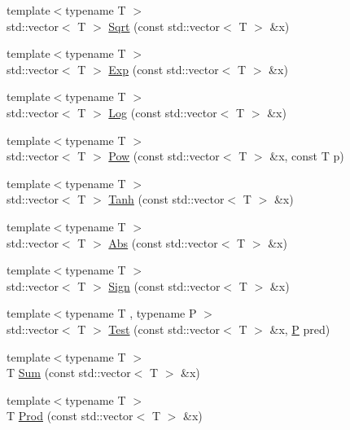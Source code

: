 \begin{DoxyCompactItemize}
{\footnotesize template$<$typename T $>$ }\\std\+::vector$<$ T $>$ \hyperlink{namespace_c_o_n_t_r_a_l_i_g_n_a816d76c04970024e87d6a1f9a683b5f6}{Sqrt} (const std\+::vector$<$ T $>$ \&x)
\item 
{\footnotesize template$<$typename T $>$ }\\std\+::vector$<$ T $>$ \hyperlink{namespace_c_o_n_t_r_a_l_i_g_n_a0c42332331fc02304c24391c147101aa}{Exp} (const std\+::vector$<$ T $>$ \&x)
\item 
{\footnotesize template$<$typename T $>$ }\\std\+::vector$<$ T $>$ \hyperlink{namespace_c_o_n_t_r_a_l_i_g_n_a2a61e9203cab173f040a408cf9dd9fff}{Log} (const std\+::vector$<$ T $>$ \&x)
\item 
{\footnotesize template$<$typename T $>$ }\\std\+::vector$<$ T $>$ \hyperlink{namespace_c_o_n_t_r_a_l_i_g_n_a17fe7e289f4cde741880207b3acc4130}{Pow} (const std\+::vector$<$ T $>$ \&x, const T p)
\item 
{\footnotesize template$<$typename T $>$ }\\std\+::vector$<$ T $>$ \hyperlink{namespace_c_o_n_t_r_a_l_i_g_n_a2bd0fc4d043cea02c1208cc7a6e43d22}{Tanh} (const std\+::vector$<$ T $>$ \&x)
\item 
{\footnotesize template$<$typename T $>$ }\\std\+::vector$<$ T $>$ \hyperlink{namespace_c_o_n_t_r_a_l_i_g_n_a881da0309b37d990b01dada1819b5d6f}{Abs} (const std\+::vector$<$ T $>$ \&x)
\item 
{\footnotesize template$<$typename T $>$ }\\std\+::vector$<$ T $>$ \hyperlink{namespace_c_o_n_t_r_a_l_i_g_n_aad158156e3616501f89ee66af1cf66ee}{Sign} (const std\+::vector$<$ T $>$ \&x)
\item 
{\footnotesize template$<$typename T , typename P $>$ }\\std\+::vector$<$ T $>$ \hyperlink{namespace_c_o_n_t_r_a_l_i_g_n_a75011b634203a445b81adaf2684162ff}{Test} (const std\+::vector$<$ T $>$ \&x, \hyperlink{pf__duplex_8c_a54f9e847235c2061dfd403c5869b5e2d}{P} pred)
\item 
{\footnotesize template$<$typename T $>$ }\\T \hyperlink{namespace_c_o_n_t_r_a_l_i_g_n_af5acb97fd09c707d30b0ba3a2f4ce343}{Sum} (const std\+::vector$<$ T $>$ \&x)
\item 
{\footnotesize template$<$typename T $>$ }\\T \hyperlink{namespace_c_o_n_t_r_a_l_i_g_n_ad582c5d78b26a7e58ee7721a42c01da6}{Prod} (const std\+::vector$<$ T $>$ \&x)

\end{DoxyCompactItemize}
